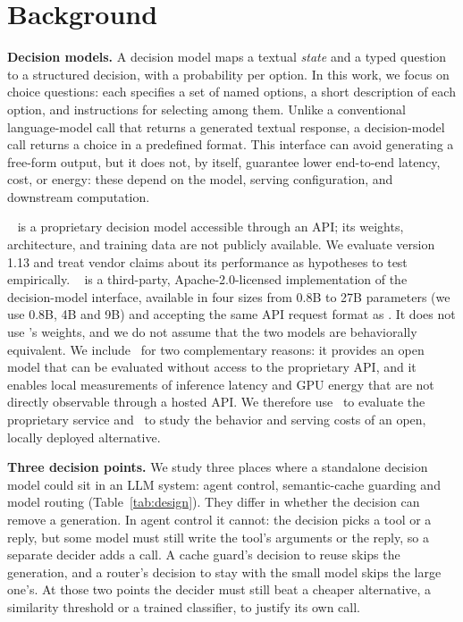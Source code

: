 \section{Background}
\label{sec:background}

\textbf{Decision models.}
A decision model maps a textual \emph{state} and a typed question to a structured decision, with a probability per option.
In this work, we focus on choice questions: each specifies a set of named options, a short description of each option, and instructions for selecting among them.
Unlike a conventional language-model call that returns a generated textual response, a decision-model call returns a choice in a predefined format.
This interface can avoid generating a free-form output, but it does not, by itself, guarantee lower end-to-end latency, cost, or energy: these depend on the model, serving configuration, and downstream computation.

\jev~\cite{typesafe2026jev} is a proprietary decision model accessible through an API; its weights, architecture, and training data are not publicly available.
We evaluate version 1.13 and treat vendor claims about its performance as hypotheses to test empirically.
\kev~\cite{palmer2026kev} is a third-party, Apache-2.0-licensed implementation of the decision-model interface, available in four sizes from 0.8B to 27B parameters (we use 0.8B, 4B and 9B) and accepting the same API request format as \jev.
It does not use \jev's weights, and we do not assume that the two models are behaviorally equivalent.
We include \kev\ for two complementary reasons: it provides an open model that can be evaluated without access to the proprietary API, and it enables local measurements of inference latency and GPU energy that are not directly observable through a hosted API.
We therefore use \jev\ to evaluate the proprietary service and \kev\ to study the behavior and serving costs of an open, locally deployed alternative.

\textbf{Three decision points.}
We study three places where a standalone decision model could sit in an LLM system: agent control, semantic-cache guarding and model routing (Table~\ref{tab:design}).
They differ in whether the decision can remove a generation.
In agent control it cannot: the decision picks a tool or a reply, but some model must still write the tool's arguments or the reply, so a separate decider adds a call.
A cache guard's decision to reuse skips the generation, and a router's decision to stay with the small model skips the large one's.
At those two points the decider must still beat a cheaper alternative, a similarity threshold or a trained classifier, to justify its own call.

